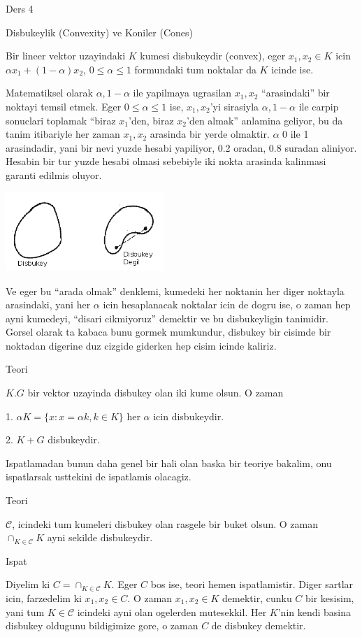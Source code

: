 \documentclass[12pt,fleqn]{article}\usepackage{../common}
\begin{document}
Ders 4

Disbukeylik (Convexity) ve Koniler (Cones)

Bir lineer vektor uzayindaki $K$ kumesi disbukeydir (convex), eger 
$x_1,x_2
\in K$ icin $\alpha x_1 + (1-\alpha)x_2$, $0 \le \alpha \le 1$ formundaki
tum noktalar da $K$ icinde ise.

Matematiksel olarak $\alpha,1-\alpha$ ile yapilmaya ugrasilan $x_1,x_2$
``arasindaki'' bir noktayi temsil etmek. Eger $0 \le \alpha \le 1$ ise,
$x_1,x_2$'yi sirasiyla $\alpha,1-\alpha$ ile carpip sonuclari toplamak
``biraz $x_1$'den, biraz $x_2$'den almak'' anlamina geliyor, bu da tanim
itibariyle her zaman $x_1,x_2$ arasinda bir yerde olmaktir. $\alpha$ 0 ile
1 arasindadir, yani bir nevi yuzde hesabi yapiliyor, 0.2 oradan, 0.8
suradan aliniyor. Hesabin bir tur yuzde hesabi olmasi sebebiyle iki nokta
arasinda kalinmasi garanti edilmis oluyor. 

\includegraphics[height=3cm]{4_1.png}

Ve eger bu ``arada olmak'' denklemi, kumedeki her noktanin her diger
noktayla arasindaki, yani her $\alpha$ icin hesaplanacak noktalar icin de
dogru ise, o zaman hep ayni kumedeyi, ``disari cikmiyoruz'' demektir ve bu
disbukeyligin tanimidir. Gorsel olarak ta kabaca bunu gormek mumkundur,
disbukey bir cisimde bir noktadan digerine duz cizgide giderken hep cisim
icinde kaliriz.

Teori 

$K.G$ bir vektor uzayinda disbukey olan iki kume olsun. O zaman 

1. $\alpha K = \{x: x = \alpha k, k \in K\}$ her $\alpha$ icin disbukeydir. 

2. $K+G$ disbukeydir. 

Ispatlamadan bunun daha genel bir hali olan baska bir teoriye bakalim, onu
ispatlarsak usttekini de ispatlamis olacagiz. 

Teori 

$\mathscr{C}$, icindeki tum kumeleri disbukey olan rasgele bir buket
olsun. O zaman $\cap_{K \in \mathscr{C}}K$ ayni sekilde disbukeydir. 

Ispat

Diyelim ki $C = \cap_{K \in \mathscr{C}}K$. Eger $C$ bos ise, teori hemen
ispatlamistir. Diger sartlar icin, farzedelim ki $x_1,x_2 \in C$. O zaman
$x_1,x_2 \in K$ demektir, cunku $C$ bir kesisim, yani tum $K \in \mathscr{C}$
icindeki ayni olan ogelerden mutesekkil. Her $K$'nin kendi basina disbukey
oldugunu bildigimize gore, o zaman $C$ de disbukey demektir. 
\end{document}
